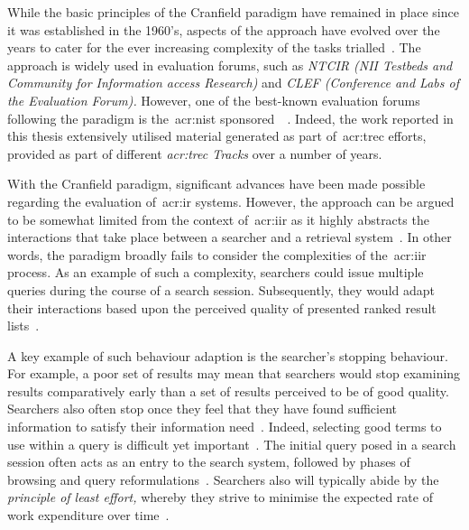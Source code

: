 While the basic principles of the Cranfield paradigm have remained in place since it was established in the 1960's, aspects of the approach have evolved over the years to cater for the ever increasing complexity of the tasks trialled~\citep{harman2010cranfield}. The approach is widely used in evaluation forums, such as \emph{NTCIR (NII Testbeds and Community for Information access Research)} and \emph{CLEF (Conference and Labs of the Evaluation Forum).} However, one of the best-known evaluation forums following the paradigm is the~\gls{acr:nist} sponsored~~\citep{harman1993trec1}. Indeed, the work reported in this thesis extensively utilised material generated as part of~\gls{acr:trec} efforts, provided as part of different \emph{\gls{acr:trec} Tracks} over a number of years.

With the Cranfield paradigm, significant advances have been made possible regarding the evaluation of~\gls{acr:ir} systems. However, the approach can be argued to be somewhat limited from the context of~\gls{acr:iir} as it highly abstracts the interactions that take place between a searcher and a retrieval system~\citep{borlund2000evaluation_iir, ingwersen2005theturn}. In other words, the paradigm broadly fails to consider the complexities of the~\gls{acr:iir} process. As an example of such a complexity, searchers could issue multiple queries during the course of a search session. Subsequently, they would adapt their interactions based upon the perceived quality of presented ranked result lists~\citep{moffat2013users_versus_models}.

A key example of such behaviour adaption is the searcher's stopping behaviour. For example, a poor set of results may mean that searchers would stop examining results comparatively early than a set of results perceived to be of good quality. Searchers also often stop once they feel that they have found sufficient information to satisfy their information need~\citep{zach2005enough_is_enough}. Indeed, selecting good terms to use within a query is difficult yet important~\citep{efthimiadis2000query_expansion}. The initial query posed in a search session often acts as an entry to the search system, followed by phases of browsing and query reformulations~\citep{marchionini1993information_seeking}. Searchers also will typically abide by the \emph{principle of least effort,} whereby they strive to minimise the expected rate of work expenditure over time~\citep{zipf1949behaviour}.


